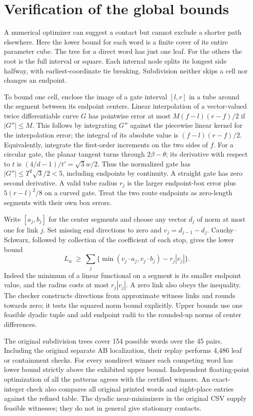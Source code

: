 \documentclass[10pt,letterpaper]{article}
\newcommand{\chapterpage}{\clearpage}
\begin{document}
\chapterpage\section{Verification of the global bounds}\label{sec:cert}
A numerical optimizer can suggest a contact but cannot exclude a shorter path elsewhere. Here the lower bound for each word is a finite cover of its entire parameter cube. The tree for a direct word has just one leaf. For the others the root is the full interval or square. Each internal node splits its longest side halfway, with earliest-coordinate tie breaking. Subdivision neither skips a cell nor changes an endpoint.
\par To bound one cell, enclose the image of a gate interval $[l,r]$ in a tube around the segment between its endpoint centers. Linear interpolation of a vector-valued twice differentiable curve $G$ has pointwise error at most $M(f-l)(r-f)/2$ if $|G''|\le M$. This follows by integrating $G''$ against the piecewise linear kernel for the interpolation error; the integral of its absolute value is $(f-l)(r-f)/2$. Equivalently, integrate the first-order increments on the two sides of $f$. For a circular gate, the planar tangent turns through $2\beta-\theta$; its derivative with respect to $t$ is $(4/d-1)/t'=\sqrt3 w/2$. Thus the normalized gate has $|G''|\le T^2\sqrt3/2<5$, including endpoints by continuity. A straight gate has zero second derivative. A valid tube radius $r_j$ is the larger endpoint-box error plus $5(r-l)^2/8$ on a curved gate. Treat the two route endpoints as zero-length segments with their own box errors.
\par Write $[a_j,b_j]$ for the center segments and choose any vector $d_j$ of norm at most one for link $j$. Set missing end directions to zero and $v_j=d_{j-1}-d_j$. Cauchy--Schwarz, followed by collection of the coefficient of each stop, gives the lower bound
\begin{equation}
     L_w\ \ge\ \sum_j\{\min(v_j\cdot a_j,v_j\cdot b_j)-r_j|v_j|\}.
     \label{eq:tube}
\end{equation}
Indeed the minimum of a linear functional on a segment is its smaller endpoint value, and the radius costs at most $r_j|v_j|$. A zero link also obeys the inequality. The checker constructs directions from approximate witness links and rounds towards zero; it tests the squared norm bound explicitly. Upper bounds use one feasible dyadic tuple and add endpoint radii to the rounded-up norms of center differences.
\par The original subdivision trees cover 154 possible words over the 45 pairs. Including the original separate AB localization, their replay performs 4,486 leaf or containment checks. For every nondirect winner each competing word has lower bound strictly above the exhibited upper bound. Independent floating-point optimization of all the patterns agrees with the certified winners. An exact-integer check also compares all original printed words and eight-place entries against the refined table. The dyadic near-minimizers in the original CSV supply feasible witnesses; they do not in general give stationary contacts.
\end{document}

